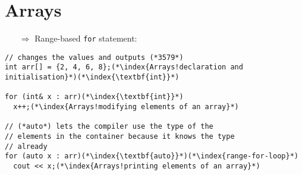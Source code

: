 \documentclass[10pt]{article}
\begin{document}
\section{Arrays}
\small
\begin{enumerate}
\item[$\Rightarrow$] Range-based \texttt{for} statement:
\end{enumerate}
\begin{lstlisting}
// changes the values and outputs (*3579*)
int arr[] = {2, 4, 6, 8};(*\index{Arrays!declaration and initialisation}*)(*\index{\textbf{int}}*)

for (int& x : arr)(*\index{\textbf{int}}*)
  x++;(*\index{Arrays!modifying elements of an array}*)

// (*auto*) lets the compiler use the type of the 
// elements in the container because it knows the type
// already
for (auto x : arr)(*\index{\textbf{auto}}*)(*\index{range-for-loop}*)
  cout << x;(*\index{Arrays!printing elements of an array}*)
\end{lstlisting}
%
%
\end{document}
